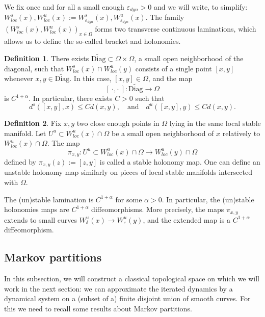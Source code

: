 \documentclass[a4paper]{article}
\theoremstyle{definition}
\newtheorem{definition}{Definition}[section]
\begin{document}
We fix once and for all a small enough $\varepsilon_{dyn}>0$ and we will write, to simplify: $W^s_{loc}(x),W^u_{loc}(x) := W^s_{\varepsilon_{dyn}}(x),W^u_{\varepsilon_{dyn}}(x)$. The family $(W^s_{loc}(x),W^u_{loc}(x))_{x \in \Omega}$ forms two transverse continuous laminations, which allows us to define the so-called bracket and holonomies. \cite{Bo75,Ha89,KH95,BS02,PR02}

\begin{definition}
There exists $\widetilde{\text{Diag}} \subset \Omega \times \Omega$, a small open neighborhood of the diagonal, such that $W^s_{loc}(x) \cap W^u_{loc}(y)$ consists of a single point $[x,y]$ whenever $x,y \in \widetilde{\text{Diag}}$. In this case, $[x,y] \in \Omega$, and the map
$$ [ \ \cdot , \cdot \ ] : \widetilde{\text{Diag}} \longrightarrow \Omega $$
is $C^{1+\alpha}$. In particular, there exists $C>0$ such that
$$ d^s([x,y],x) \leq C d(x,y), \quad \text{and} \quad d^u([x,y],y) \leq C d(x,y).$$

\end{definition}


\begin{definition} Fix $x,y$  two close enough points in $\Omega$ lying in the same local stable manifold. Let $U^u \subset W^u_{loc}(x) \cap \Omega$ be a small open neighborhood of $x$ relatively to $ W^u_{loc}(x) \cap \Omega$. The map
$$ \pi_{x,y} : U^u \subset W^u_{loc}(x) \cap \Omega \longrightarrow W^u_{loc}(y) \cap \Omega $$
defined by $\pi_{x,y}(z) := [z,y]$ is called a stable holonomy map. One can define an unstable holonomy map similarly on pieces of local stable manifolds intersected with $\Omega$.
\end{definition}


The (un)stable lamination is $C^{1+\alpha}$ for some $\alpha>0$. In particular, the (un)stable holonomies maps are $C^{1 + \alpha}$ diffeomorphisms. More precisely, the maps $\pi_{x,y}$ extends to small curves $W^u_\delta(x) \rightarrow W^u_\varepsilon(y)$, and the extended map is a $C^{1+\alpha}$ diffeomorphism.


\subsection{Markov partitions}

In this subsection, we will construct a classical topological space on which we will work in the next section: we can approximate the iterated dynamics by a dynamical system on a (subset of a) finite disjoint union of smooth curves. For this we need to recall some results about Markov partitions.
\end{document}
